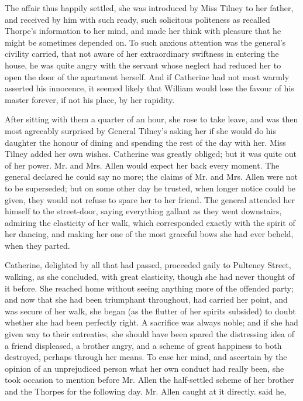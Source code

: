 The affair thus happily settled, she was introduced by Miss Tilney to her father, and received by him with such ready, such solicitous politeness as recalled Thorpe's information to her mind, and made her think with pleasure that he might be sometimes depended on. To such anxious attention was the general's civility carried, that not aware of her extraordinary swiftness in entering the house, he was quite angry with the servant whose neglect had reduced her to open the door of the apartment herself.  And if Catherine had not most warmly asserted his innocence, it seemed likely that William would lose the favour of his master forever, if not his place, by her rapidity.

After sitting with them a quarter of an hour, she rose to take leave, and was then most agreeably surprised by General Tilney's asking her if she would do his daughter the honour of dining and spending the rest of the day with her. Miss Tilney added her own wishes. Catherine was greatly obliged; but it was quite out of her power. Mr. and Mrs. Allen would expect her back every moment. The general declared he could say no more; the claims of Mr. and Mrs. Allen were not to be superseded; but on some other day he trusted, when longer notice could be given, they would not refuse to spare her to her friend.  The general attended her himself to the street-door, saying everything gallant as they went downstairs, admiring the elasticity of her walk, which corresponded exactly with the spirit of her dancing, and making her one of the most graceful bows she had ever beheld, when they parted.

Catherine, delighted by all that had passed, proceeded gaily to Pulteney Street, walking, as she concluded, with great elasticity, though she had never thought of it before. She reached home without seeing anything more of the offended party; and now that she had been triumphant throughout, had carried her point, and was secure of her walk, she began (as the flutter of her spirits subsided) to doubt whether she had been perfectly right. A sacrifice was always noble; and if she had given way to their entreaties, she should have been spared the distressing idea of a friend displeased, a brother angry, and a scheme of great happiness to both destroyed, perhaps through her means. To ease her mind, and ascertain by the opinion of an unprejudiced person what her own conduct had really been, she took occasion to mention before Mr. Allen the half-settled scheme of her brother and the Thorpes for the following day. Mr. Allen caught at it directly.  said he, 


